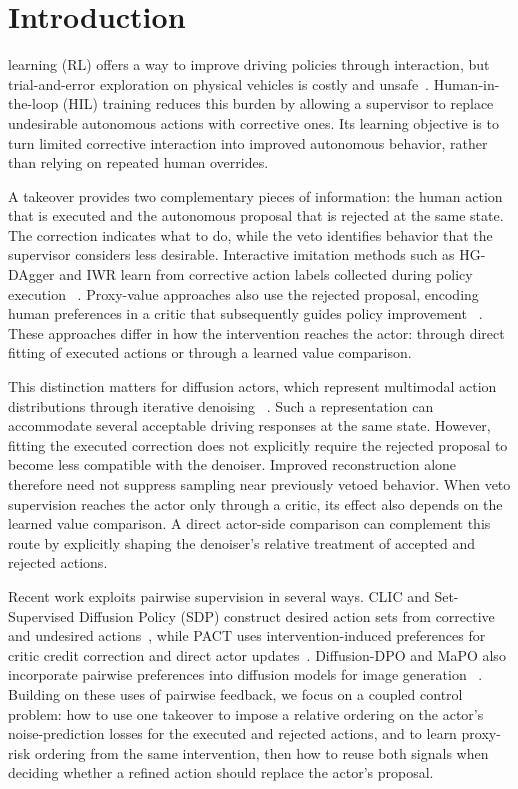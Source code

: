 \documentclass[9pt,journal]{IEEEtran}
\begin{document}
\section{Introduction}
\label{sec:intro}

 learning (RL) offers a way to improve
driving policies through interaction, but trial-and-error exploration on
physical vehicles is costly and unsafe~\cite{li2022haco,li2025hdsac}.
Human-in-the-loop (HIL) training reduces this burden by allowing a
supervisor to replace undesirable autonomous actions with corrective
ones. Its learning objective is to turn limited corrective interaction
into improved autonomous behavior, rather than relying on repeated
human overrides.

A takeover provides two complementary pieces of information: the human
action that is executed and the autonomous proposal that is rejected at
the same state. The correction indicates what to do, while the veto
identifies behavior that the supervisor considers less desirable.
Interactive imitation methods such as HG-DAgger and IWR learn from
corrective action labels collected during policy execution
~\cite{kelly2019hgdagger,mandlekar2020iwr}.
Proxy-value approaches also use the rejected proposal, encoding human
preferences in a critic that subsequently guides policy improvement
~\cite{li2022haco,peng2023pvp,huang2024haim,li2025hdsac}.
These approaches differ in how the intervention reaches the actor:
through direct fitting of executed actions or through a learned value
comparison.

This distinction matters for diffusion actors, which represent
multimodal action distributions through iterative denoising
~\cite{chi2024diffusionpolicy,wang2024dacer}.
Such a representation can accommodate several acceptable driving
responses at the same state. However, fitting the executed correction
does not explicitly require the rejected proposal to become less
compatible with the denoiser. Improved reconstruction alone therefore
need not suppress sampling near previously vetoed behavior. When veto
supervision reaches the actor only through a critic, its effect also
depends on the learned value comparison. A direct actor-side comparison
can complement this route by explicitly shaping the denoiser's relative
treatment of accepted and rejected actions.

Recent work exploits pairwise supervision in several ways. CLIC and
Set-Supervised Diffusion Policy (SDP) construct desired action sets from
corrective and undesired actions~\cite{li2025clic,li2026sdp}, while PACT
uses intervention-induced preferences for critic credit correction and
direct actor updates~\cite{liu2026pact}.
Diffusion-DPO and MaPO also incorporate pairwise preferences into
diffusion models for image generation
~\cite{wallace2024diffusiondpo,hong2026mapo}.
Building on these uses of pairwise feedback, we focus on a coupled
control problem: how to use one takeover to impose a relative ordering on the
actor's noise-prediction losses for the executed and rejected actions,
and to learn proxy-risk ordering from the same intervention, then
how to reuse both signals when deciding whether a refined action
should replace the actor's proposal.
\end{document}
